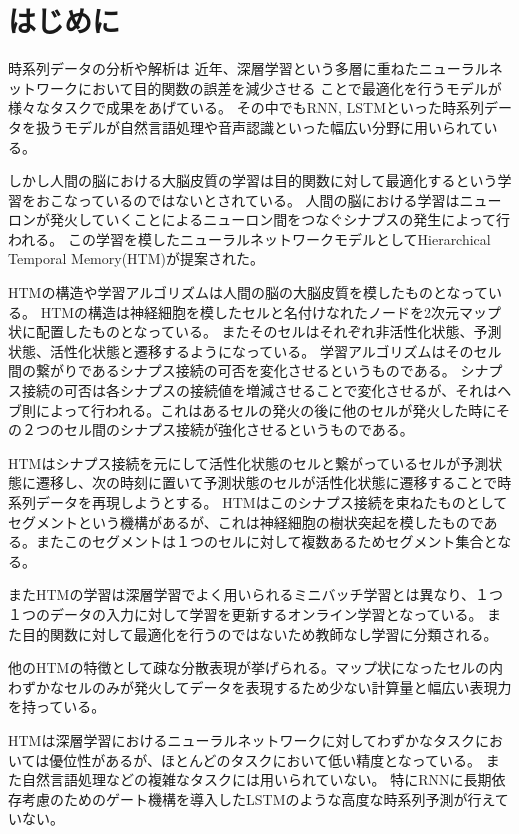 \chapter{はじめに}
時系列データの分析や解析は
近年、深層学習という多層に重ねたニューラルネットワークにおいて目的関数の誤差を減少させる
ことで最適化を行うモデルが様々なタスクで成果をあげている。
その中でもRNN, LSTMといった時系列データを扱うモデルが自然言語処理や音声認識といった幅広い分野に用いられている。

しかし人間の脳における大脳皮質の学習は目的関数に対して最適化するという学習をおこなっているのではないとされている。\cite{neurons}
人間の脳における学習はニューロンが発火していくことによるニューロン間をつなぐシナプスの発生によって行われる。
この学習を模したニューラルネットワークモデルとしてHierarchical Temporal Memory(HTM)が提案された。\cite{htm}

HTMの構造や学習アルゴリズムは人間の脳の大脳皮質を模したものとなっている。
HTMの構造は神経細胞を模したセルと名付けなれたノードを2次元マップ状に配置したものとなっている。
またそのセルはそれぞれ非活性化状態、予測状態、活性化状態と遷移するようになっている。
学習アルゴリズムはそのセル間の繋がりであるシナプス接続の可否を変化させるというものである。
シナプス接続の可否は各シナプスの接続値を増減させることで変化させるが、それはヘブ則によって行われる。これはあるセルの発火の後に他のセルが発火した時にその２つのセル間のシナプス接続が強化させるというものである。

HTMはシナプス接続を元にして活性化状態のセルと繋がっているセルが予測状態に遷移し、次の時刻に置いて予測状態のセルが活性化状態に遷移することで時系列データを再現しようとする。
HTMはこのシナプス接続を束ねたものとしてセグメントという機構があるが、これは神経細胞の樹状突起を模したものである。またこのセグメントは１つのセルに対して複数あるためセグメント集合となる。

またHTMの学習は深層学習でよく用いられるミニバッチ学習とは異なり、１つ１つのデータの入力に対して学習を更新するオンライン学習となっている。
また目的関数に対して最適化を行うのではないため教師なし学習に分類される。

他のHTMの特徴として疎な分散表現が挙げられる。マップ状になったセルの内わずかなセルのみが発火してデータを表現するため少ない計算量と幅広い表現力を持っている。

HTMは深層学習におけるニューラルネットワークに対してわずかなタスクにおいては優位性があるが、ほとんどのタスクにおいて低い精度となっている。
また自然言語処理などの複雑なタスクには用いられていない。
特にRNNに長期依存考慮のためのゲート機構を導入したLSTMのような高度な時系列予測が行えていない。

